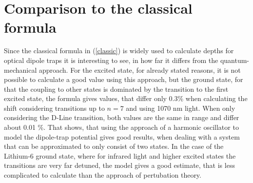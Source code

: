 

\section{Comparison to the classical formula}

Since the classical formula in (\ref{classic}) is widely used to calculate depths for optical dipole traps it is interesting to see, in how far it differs from the quantum-mechanical approach. For the excited state, for already stated reasons, it is not possible to calculate a good value using this approach, but the ground state, for that the coupling to other states is dominated by the transition to the first excited state, the formula gives values, that differ only 0.3\% when calculating the shift considering transitions up to $n=7$ and using 1070 nm light. When only considering the D-Line transition, both values are the same in range and differ about 0.01 \%. That shows, that using the approach of a harmonic oscillator to model the dipole-trap potential gives good results, when dealing with a system that can be approximated to only consist of two states. In the case of the Lithium-6 ground state, where for infrared light and higher excited states the transitions are very far detuned, the model gives a good estimate, that is less complicated to calculate than the approach of pertubation theory.